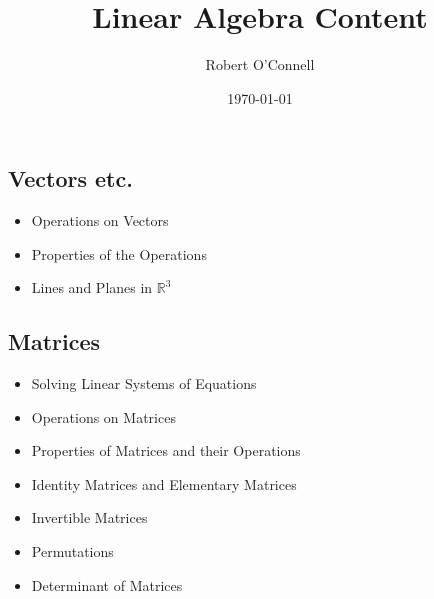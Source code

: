 \documentclass{article}
\title{\textbf{Linear Algebra Content}}
\author{Robert O'Connell}
\date{\today}
\begin{document}
\maketitle

\subsection*{Vectors etc.}
\begin{itemize}
    \item Operations on Vectors
    \item Properties of the Operations
    \item Lines and Planes in \(\mathbb{R}^3\)
\end{itemize}

\subsection*{Matrices}
\begin{itemize}
    \item Solving Linear Systems of Equations
    \item Operations on Matrices
    \item Properties of Matrices and their Operations
    \item Identity Matrices and Elementary Matrices
    \item Invertible Matrices
    \item Permutations
    \item Determinant of Matrices
\end{itemize}
\end{document}
